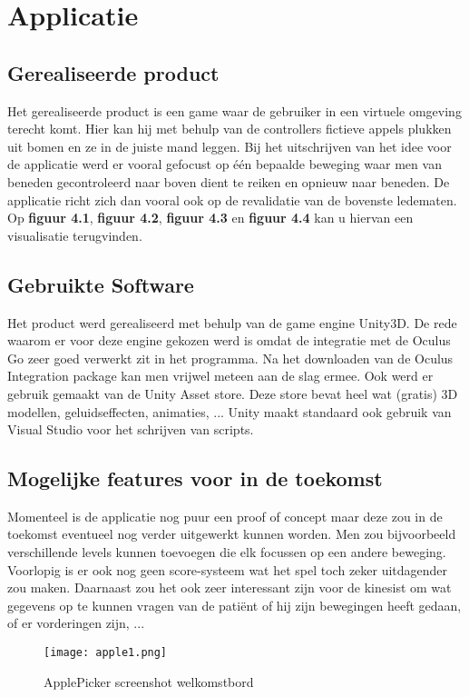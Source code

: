 \chapter{Applicatie}
\label{ch:applicatie}

\section{Gerealiseerde product}
Het gerealiseerde product is een game waar de gebruiker in een virtuele omgeving terecht komt. Hier kan hij met behulp van de controllers fictieve appels plukken uit bomen en ze in de juiste mand leggen. Bij het uitschrijven van het idee voor de applicatie werd er vooral gefocust op één bepaalde beweging waar men van beneden gecontroleerd naar boven dient te reiken en opnieuw naar beneden. De applicatie richt zich dan vooral ook op de revalidatie van de bovenste ledematen. Op \textbf{figuur 4.1}, \textbf{figuur 4.2}, \textbf{figuur 4.3} en \textbf{figuur 4.4} kan u hiervan een visualisatie terugvinden.

\section{Gebruikte Software}
Het product werd gerealiseerd met behulp van de game engine Unity3D. De rede waarom er voor deze engine gekozen werd is omdat de integratie met de Oculus Go zeer goed verwerkt zit in het programma. Na het downloaden van de Oculus Integration package kan men vrijwel meteen aan de slag ermee. Ook werd er gebruik gemaakt van de Unity Asset store. Deze store bevat heel wat (gratis) 3D modellen, geluidseffecten, animaties, ...
Unity maakt standaard ook gebruik van Visual Studio voor het schrijven van scripts.

\section{Mogelijke features voor in de toekomst}
Momenteel is de applicatie nog puur een proof of concept maar deze zou in de toekomst eventueel nog verder uitgewerkt kunnen worden. Men zou bijvoorbeeld verschillende levels kunnen toevoegen die elk focussen op een andere beweging. Voorlopig is er ook nog geen score-systeem wat het spel toch zeker uitdagender zou maken. Daarnaast zou het ook zeer interessant zijn voor de kinesist om wat gegevens op te kunnen vragen van de patiënt of hij zijn bewegingen heeft gedaan, of er vorderingen zijn, ...

\begin{figure}[h]
    \centering
    \texttt{[image: apple1.png]}
    \caption{ApplePicker screenshot welkomstbord}
\end{figure}

